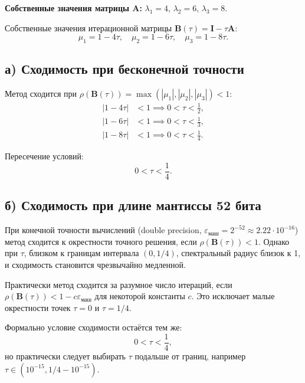 \documentclass{article}
\begin{document}
\textbf{Собственные значения матрицы $\mathbf{A}$:} $\lambda_1 = 4$, $\lambda_2 = 6$, $\lambda_3 = 8$.

Собственные значения итерационной матрицы $\mathbf{B}(\tau) = \mathbf{I} - \tau\mathbf{A}$:
\begin{equation}
\mu_1 = 1 - 4\tau, \quad \mu_2 = 1 - 6\tau, \quad \mu_3 = 1 - 8\tau.
\end{equation}

\subsection*{а) Сходимость при бесконечной точности}

Метод сходится при $\rho(\mathbf{B}(\tau)) = \max(|\mu_1|, |\mu_2|, |\mu_3|) < 1$:
\begin{align}
|1 - 4\tau| &< 1 \implies 0 < \tau < \frac{1}{2}, \\
|1 - 6\tau| &< 1 \implies 0 < \tau < \frac{1}{3}, \\
|1 - 8\tau| &< 1 \implies 0 < \tau < \frac{1}{4}.
\end{align}

Пересечение условий:
\begin{equation}
\boxed{0 < \tau < \frac{1}{4}.}
\end{equation}

\subsection*{б) Сходимость при длине мантиссы 52 бита}

При конечной точности вычислений (double precision, $\varepsilon_{\text{маш}} = 2^{-52} \approx 2.22 \cdot 10^{-16}$) метод сходится к окрестности точного решения, если $\rho(\mathbf{B}(\tau)) < 1$. Однако при $\tau$, близком к границам интервала $(0, 1/4)$, спектральный радиус близок к 1, и сходимость становится чрезвычайно медленной.

Практически метод сходится за разумное число итераций, если $\rho(\mathbf{B}(\tau)) < 1 - c\varepsilon_{\text{маш}}$ для некоторой константы $c$. Это исключает малые окрестности точек $\tau = 0$ и $\tau = 1/4$.

Формально условие сходимости остаётся тем же:
\begin{equation}
\boxed{0 < \tau < \frac{1}{4},}
\end{equation}
но практически следует выбирать $\tau$ подальше от границ, например $\tau \in (10^{-15}, 1/4 - 10^{-15})$.
\end{document}
